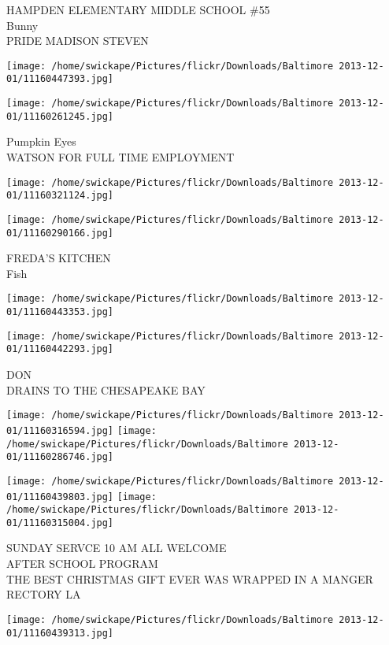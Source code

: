 \documentclass[10pt,letterpaper]{article}
\begin{document}
HAMPDEN ELEMENTARY MIDDLE SCHOOL \#55\\
Bunny\\
PRIDE MADISON STEVEN
\pagebreak

\texttt{[image: /home/swickape/Pictures/flickr/Downloads/Baltimore 2013-12-01/11160447393.jpg]}

\vspace{0.25in}
\texttt{[image: /home/swickape/Pictures/flickr/Downloads/Baltimore 2013-12-01/11160261245.jpg]}

Pumpkin Eyes\\
WATSON FOR FULL TIME EMPLOYMENT
\pagebreak

\texttt{[image: /home/swickape/Pictures/flickr/Downloads/Baltimore 2013-12-01/11160321124.jpg]}

\vspace{0.25in}
\texttt{[image: /home/swickape/Pictures/flickr/Downloads/Baltimore 2013-12-01/11160290166.jpg]}

FREDA'S KITCHEN\\
Fish
\pagebreak

\texttt{[image: /home/swickape/Pictures/flickr/Downloads/Baltimore 2013-12-01/11160443353.jpg]}

\vspace{0.25in}
\texttt{[image: /home/swickape/Pictures/flickr/Downloads/Baltimore 2013-12-01/11160442293.jpg]}

DON\\
DRAINS TO THE CHESAPEAKE BAY
\pagebreak

\texttt{[image: /home/swickape/Pictures/flickr/Downloads/Baltimore 2013-12-01/11160316594.jpg]}
\texttt{[image: /home/swickape/Pictures/flickr/Downloads/Baltimore 2013-12-01/11160286746.jpg]}

\texttt{[image: /home/swickape/Pictures/flickr/Downloads/Baltimore 2013-12-01/11160439803.jpg]}
\texttt{[image: /home/swickape/Pictures/flickr/Downloads/Baltimore 2013-12-01/11160315004.jpg]}

SUNDAY SERVCE 10 AM ALL WELCOME\\
AFTER SCHOOL PROGRAM\\
THE BEST CHRISTMAS GIFT EVER WAS WRAPPED IN A MANGER\\
RECTORY LA
\pagebreak

\texttt{[image: /home/swickape/Pictures/flickr/Downloads/Baltimore 2013-12-01/11160439313.jpg]}
\end{document}
